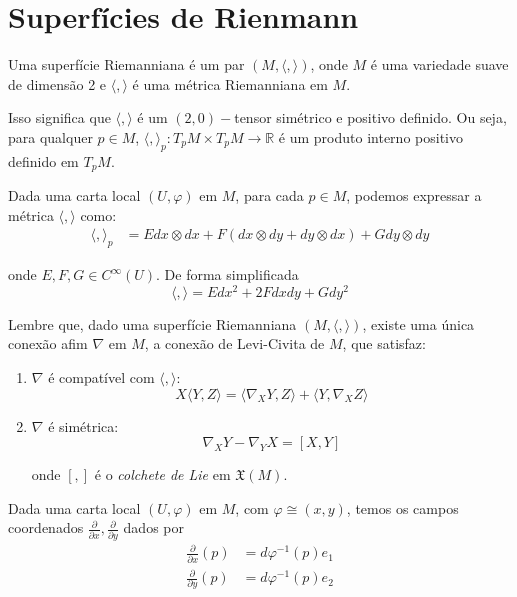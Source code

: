 \section{Superfícies de Rienmann}

\begin{defi}
	Uma superfície Riemanniana é um par $(M, \langle, \rangle)$, onde $M$ é uma variedade suave de dimensão 2 e $\langle, \rangle$ é uma métrica Riemanniana em $M$.
\end{defi}

Isso significa que $\langle,\rangle$ é um $(2,0)-$tensor simétrico e positivo definido. Ou seja, para qualquer $p \in M$, $\langle,\rangle_p: T_pM \times T_pM \rightarrow \mathbb{R}$ é um produto interno positivo definido em $T_pM$.

Dada uma carta local $(U,\varphi)$ em $M$, para cada $p \in M$, podemos expressar a métrica $\langle,\rangle$ como:
\begin{align*}
	\langle,\rangle_p &= E dx \otimes dx + F (dx \otimes dy + dy \otimes dx) + G dy \otimes dy
\end{align*}

onde $E,F,G \in C^{\infty}(U)$. De forma simplificada
\begin{equation*}
	\langle,\rangle = E dx^2 + 2F dx dy + G dy^2
\end{equation*}

Lembre que, dado uma superfície Riemanniana $(M,\langle,\rangle)$, existe uma única conexão afim $\nabla$ em $M$, a conexão de Levi-Civita de $M$, que satisfaz:
\begin{enumerate}
	\item $\nabla$ é compatível com $\langle,\rangle$:
	\begin{equation}\label{conexao_prop_derivada}
		X \langle Y,Z \rangle = \langle \nabla_X Y, Z \rangle + \langle Y, \nabla_X Z \rangle
	\end{equation}
	
	\item $\nabla$ é simétrica:
	\begin{equation*}
		\nabla_X Y - \nabla_Y X = [X,Y]
	\end{equation*}
	
	onde $[,]$ é o \emph{colchete de Lie} em $\mathfrak{X}(M)$.
\end{enumerate}

Dada uma carta local $(U,\varphi)$ em $M$, com $\varphi \cong (x,y)$, temos os campos coordenados $\frac{\partial}{\partial x}, \frac{\partial}{\partial y}$ dados por
\begin{align*}
	\frac{\partial}{\partial x}(p) &= d \varphi^{-1}(p) e_1\\
	\frac{\partial}{\partial y}(p) &= d \varphi^{-1}(p) e_2
\end{align*}

